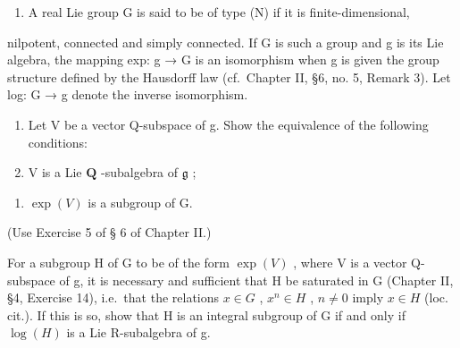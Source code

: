 \begin{enumerate}
\def\labelenumi{\arabic{enumi}.}
\setcounter{enumi}{28}
\tightlist
\item
  A real Lie group G is said to be of type (N) if it is finite-dimensional,
\end{enumerate}

nilpotent, connected and simply connected. If G is such a group and g is its Lie algebra, the mapping exp: g → G is an isomorphism when g is given the group structure defined by the Hausdorff law (cf.~Chapter II, §6, no. 5, Remark 3). Let log: G → g denote the inverse isomorphism.

\begin{enumerate}
\def\labelenumi{(\alph{enumi})}
\item
  Let V be a vector Q-subspace of g. Show the equivalence of the following conditions:
\item
  V is a Lie \(\mathbf{Q}\) -subalgebra of \(\mathfrak{g}\) ;
\end{enumerate}

\begin{enumerate}
\def\labelenumi{(\roman{enumi})}
\setcounter{enumi}{1}
\tightlist
\item
  \(\exp(V)\) is a subgroup of G.
\end{enumerate}

(Use Exercise 5 of § 6 of Chapter II.)

For a subgroup H of G to be of the form \(\exp(V)\) , where V is a vector Q-subspace of g, it is necessary and sufficient that H be saturated in G (Chapter II, §4, Exercise 14), i.e.~that the relations \(x \in G\) , \(x^{n} \in H\) , \(n \neq 0\) imply \(x \in H\) (loc. cit.). If this is so, show that H is an integral subgroup of G if and only if \(\log(H)\) is a Lie R-subalgebra of g.

